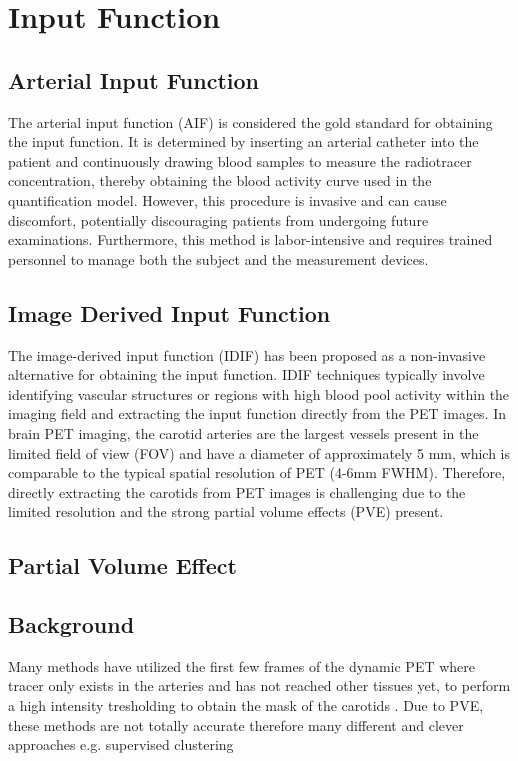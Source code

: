 \section{Input Function}
\subsection{Arterial Input Function}
The arterial input function (AIF) is considered the gold standard for obtaining the input function.
It is determined by inserting an arterial catheter into the patient and continuously drawing blood samples to measure the radiotracer concentration, thereby obtaining the blood activity curve used in the quantification model.
However, this procedure is invasive and can cause discomfort, potentially discouraging patients from undergoing future examinations.
Furthermore, this method is labor-intensive and requires trained personnel to manage both the subject and the measurement devices.

\subsection{Image Derived Input Function}
The image-derived input function (IDIF) has been proposed as a non-invasive alternative for obtaining the input function.
IDIF techniques typically involve identifying vascular structures or regions with high blood pool activity within the imaging field and extracting the input function directly from the PET images.
In brain PET imaging, the carotid arteries are the largest vessels present in the limited field of view (FOV) and have a diameter of approximately 5 mm, which is comparable to the typical spatial resolution of PET (4-6mm FWHM).
Therefore, directly extracting the carotids from PET images is challenging due to the limited resolution and the strong partial volume effects (PVE) present.

\subsection{Partial Volume Effect}

\subsection{Background}
Many methods have utilized the first few frames of the dynamic PET where tracer only exists in the arteries and has not reached other tissues yet, to perform a high intensity tresholding to obtain the mask of the carotids \cite{young2023image}.
Due to PVE, these methods are not totally accurate therefore many different and clever approaches e.g. supervised clustering




